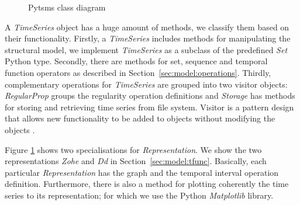 \begin{figure}[tp]
  \centering



  \caption{Pytsms  class diagram}
  \label{fig:implementacio:pytsms-uml}
\end{figure}




A \emph{TimeSeries} object has a huge amount of methods, we classify
them based on their functionality. Firstly, a \emph{TimeSeries}
includes methods for manipulating the structural model, we implement
\emph{TimeSeries} as a subclass of the predefined \emph{Set} Python
type. Secondly, there are methods for set, sequence and temporal
function operators as described in Section~\ref{sec:model:operations}.
Thirdly, complementary operations for \emph{TimeSeries} are grouped
into two visitor objects: \emph{RegularProp} groups the regularity
operation definitions and \emph{Storage} has methods for storing and
retrieving time series from file system. Visitor is a pattern design
that allows new functionality to be added to objects without modifying
the objects
\cite{ziade08:expert_python_programming:visitor,martin02:visitor}.


Figure \ref{fig:implementacio:pytsms-uml} shows two specialisations
for \emph{Representation}. We show the two representations \emph{Zohe}
and \emph{Dd} in Section~\ref{sec:model:tfunc}. Basically, each
particular \emph{Representation} has the graph and the temporal
interval operation definition. Furthermore, there is also a method for
plotting coherently the time series to its representation; for which
we use the Python \emph{Matplotlib} library.



